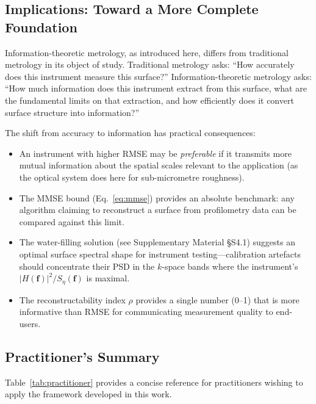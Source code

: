 \documentclass[review,12pt]{elsarticle}
\begin{document}
\subsection{Implications: Toward a More Complete Foundation}

Information-theoretic metrology, as introduced here, differs from traditional metrology in its object of study. Traditional metrology asks: ``How accurately does this instrument measure this surface?'' Information-theoretic metrology asks: ``How much information does this instrument extract from this surface, what are the fundamental limits on that extraction, and how efficiently does it convert surface structure into information?''

The shift from accuracy to information has practical consequences:
\begin{itemize}
    \item An instrument with higher RMSE may be \emph{preferable} if it transmits more mutual information about the spatial scales relevant to the application (as the optical system does here for sub-micrometre roughness).
    \item The MMSE bound (Eq.~\ref{eq:mmse}) provides an absolute benchmark: any algorithm claiming to reconstruct a surface from profilometry data can be compared against this limit.
    \item The water-filling solution (see Supplementary Material \S S4.1) suggests an optimal surface spectral shape for instrument testing---calibration artefacts should concentrate their PSD in the $k$-space bands where the instrument's $|H(\mathbf{f})|^2/S_\eta(\mathbf{f})$ is maximal.
    \item The reconstructability index $\rho$ provides a single number (0--1) that is more informative than RMSE for communicating measurement quality to end-users.
\end{itemize}

\subsection*{Practitioner's Summary}

Table~\ref{tab:practitioner} provides a concise reference for practitioners wishing to apply the framework developed in this work.
\end{document}
